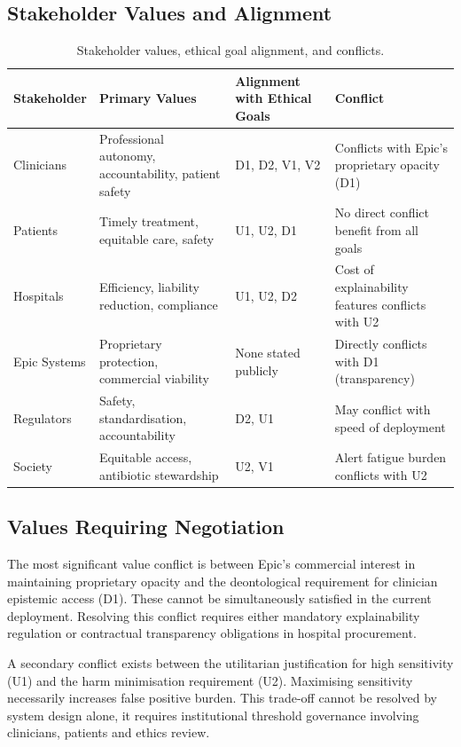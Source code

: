 \documentclass[]{UCD_CS_41820_Report}
\begin{document}
\subsection*{Stakeholder Values and Alignment}

\begin{table}[H]
\centering
\renewcommand{\arraystretch}{1.3}
\begin{tabular}{@{}p{3cm}p{4cm}p{3cm}p{4cm}@{}}
\toprule
\textbf{Stakeholder} & \textbf{Primary Values} & \textbf{Alignment with Ethical Goals} & \textbf{Conflict} \\
\midrule
Clinicians
  & Professional autonomy, accountability, patient safety
  & D1, D2, V1, V2
  & Conflicts with Epic's proprietary opacity (D1) \\[4pt]
Patients
  & Timely treatment, equitable care, safety
  & U1, U2, D1
  & No direct conflict benefit from all goals \\[4pt]
Hospitals
  & Efficiency, liability reduction, compliance
  & U1, U2, D2
  & Cost of explainability features conflicts with U2 \\[4pt]
Epic Systems
  & Proprietary protection, commercial viability
  & None stated publicly
  & Directly conflicts with D1 (transparency) \\[4pt]
Regulators
  & Safety, standardisation, accountability
  & D2, U1
  & May conflict with speed of deployment \\[4pt]
Society
  & Equitable access, antibiotic stewardship
  & U2, V1
  & Alert fatigue burden conflicts with U2 \\
\bottomrule
\end{tabular}
\caption{Stakeholder values, ethical goal alignment, and conflicts.}
\label{tab:stakeholder_values}
\end{table}

\subsection*{Values Requiring Negotiation}

The most significant value conflict is between Epic's commercial interest in
maintaining proprietary opacity and the deontological requirement for clinician
epistemic access (D1). These cannot be simultaneously satisfied in the current
deployment. Resolving this conflict requires either mandatory explainability
regulation or contractual transparency obligations in hospital procurement.

A secondary conflict exists between the utilitarian justification for high
sensitivity (U1) and the harm minimisation requirement (U2). Maximising sensitivity
necessarily increases false positive burden. This trade-off cannot be resolved by
system design alone, it requires institutional threshold governance involving
clinicians, patients and ethics review.
\end{document}
